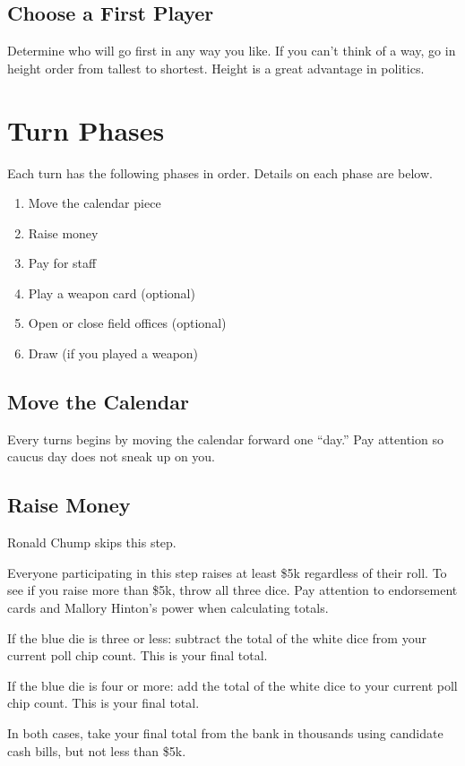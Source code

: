\documentclass[twocolumn]{article}
\begin{document}
\subsection{Choose a First Player}

Determine who will go first in any way you like. If you can't think of a way, go in height order from tallest to shortest. Height is a great advantage in politics.

\section{Turn Phases}

Each turn has the following phases in order. Details on each phase are below.

\begin{enumerate}
\item Move the calendar piece
\item Raise money
\item Pay for staff
\item Play a weapon card (optional)
\item Open or close field offices (optional)
\item Draw (if you played a weapon)
\end{enumerate}

\subsection{Move the Calendar}
Every turns begins by moving the calendar forward one ``day.'' Pay attention so caucus day does not sneak up on you.

\subsection{Raise Money}
Ronald Chump skips this step.

Everyone participating in this step raises at least \$5k regardless of their roll.
To see if you raise more than \$5k, throw all three dice.
Pay attention to endorsement cards and Mallory Hinton's power when calculating totals.

If the blue die is three or less: subtract the total of the white dice from your current poll chip count. This is your final total.

If the blue die is four or more: add the total of the white dice to your current poll chip count. This is your final total.

In both cases, take your final total from the bank in thousands using candidate cash bills, but not less than \$5k. 
\end{document}
